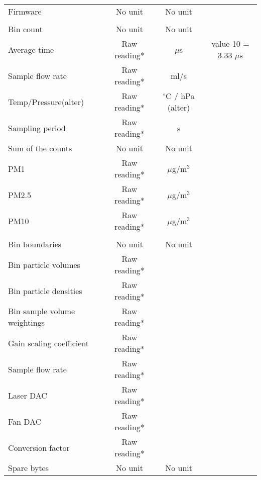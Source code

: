 \begin{center}
\begin{longtable}{|l|c|c|c|}
 \rowcolor{black!2} \multicolumn{4}{|c|}{{Firmware}} \\ \hline
    Firmware & No unit & No unit & \\ \hline
 
 \rowcolor{black!2} \multicolumn{4}{|c|}{{Histogram}} \\ \hline
    Bin count & No unit & No unit & \\ \hline
    Average time & Raw reading* & $\mu$s & value 10 = 3.33 $\mu$s \\ \hline
    Sample flow rate & Raw reading* & ml/s & \\ \hline
    Temp/Pressure(alter) & Raw reading* & $^{\circ}$C / hPa (alter) & \\ \hline
    Sampling period & Raw reading* & s & \\ \hline
    Sum of the counts & No unit & No unit & \\ \hline
    PM1 & Raw reading* & $\mu$g/m$^3$ & \\ \hline
    PM2.5 & Raw reading* & $\mu$g/m$^3$ & \\ \hline
    PM10 & Raw reading* & $\mu$g/m$^3$ & \\ \hline

 
 \rowcolor{black!2} \multicolumn{4}{|c|}{{Configuration}} \\ \hline
    Bin boundaries & No unit & No unit & \\ \hline 
    Bin particle volumes & Raw reading* & & \\ \hline
    Bin particle densities & Raw reading* & & \\ \hline
    Bin sample volume weightings & Raw reading* & & \\ \hline
    Gain scaling coefficient & Raw reading* & & \\ \hline
    Sample flow rate & Raw reading* & & \\ \hline
    Laser DAC & Raw reading* & & \\ \hline
    Fan DAC & Raw reading* & & \\ \hline
    Conversion factor & Raw reading* & & \\ \hline
    Spare bytes & No unit & No unit &\\ 
\end{longtable}

	\begin{minipage}{\textwidth}    %
	\end{minipage}

\end{center}

